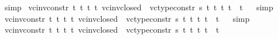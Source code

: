 \begin{isabellebody}
%
\isatagproof
{}\isamarkupfalse%
\ simp%
\endisatagproof
{\isafoldproof}%
%
\isadelimproof
%
\endisadelimproof
\isanewline
{}\isamarkupfalse%
\ vc{\isacharunderscore}{\kern0pt}inv{\isacharunderscore}{\kern0pt}constr{\isacharunderscore}{\kern0pt}{}{}{\isacharcolon}{\kern0pt}{\isachardoublequoteopen}{\isasymforall}\ t{}\ t{}\ t{}\ t{}{\isachardot}{\kern0pt}\ vc{\isacharunderscore}{\kern0pt}inv{\isacharunderscore}{\kern0pt}closed\ {}\ {\isacharparenleft}{\kern0pt}vc{\isacharunderscore}{\kern0pt}type{\isacharunderscore}{\kern0pt}constr{}\ s\ t{}\ t{}\ t{}\ t{}{\isacharparenright}{\kern0pt}\ {\isacharequal}{\kern0pt}\ t{}{\isachardoublequoteclose}%
\isadelimproof
\ %
\endisadelimproof
%
\isatagproof
{}\isamarkupfalse%
\ simp%
\endisatagproof
{\isafoldproof}%
%
\isadelimproof
%
\endisadelimproof
\isanewline
{}\isamarkupfalse%
\ vc{\isacharunderscore}{\kern0pt}inv{\isacharunderscore}{\kern0pt}constr{\isacharunderscore}{\kern0pt}{}{}{\isacharcolon}{\kern0pt}{\isachardoublequoteopen}{\isasymforall}\ t{}\ t{}\ t{}\ t{}{\isachardot}{\kern0pt}\ vc{\isacharunderscore}{\kern0pt}inv{\isacharunderscore}{\kern0pt}closed\ {}\ {\isacharparenleft}{\kern0pt}vc{\isacharunderscore}{\kern0pt}type{\isacharunderscore}{\kern0pt}constr{}\ s\ t{}\ t{}\ t{}\ t{}{\isacharparenright}{\kern0pt}\ {\isacharequal}{\kern0pt}\ t{}{\isachardoublequoteclose}%
\isadelimproof
\ %
\endisadelimproof
%
\isatagproof
{}\isamarkupfalse%
\ simp%
\endisatagproof
{\isafoldproof}%
%
\isadelimproof
%
\endisadelimproof
\isanewline
{}\isamarkupfalse%
\ vc{\isacharunderscore}{\kern0pt}inv{\isacharunderscore}{\kern0pt}constr{\isacharunderscore}{\kern0pt}{}{}{\isacharcolon}{\kern0pt}{\isachardoublequoteopen}{\isasymforall}\ t{}\ t{}\ t{}\ t{}{\isachardot}{\kern0pt}\ vc{\isacharunderscore}{\kern0pt}inv{\isacharunderscore}{\kern0pt}closed\ {}\ {\isacharparenleft}{\kern0pt}vc{\isacharunderscore}{\kern0pt}type{\isacharunderscore}{\kern0pt}constr{}\ s\ t{}\ t{}\ t{}\ t{}{\isacharparenright}{\kern0pt}\ {\isacharequal}{\kern0pt}\ t{}{\isachardoublequoteclose}%

\end{isabellebody}
